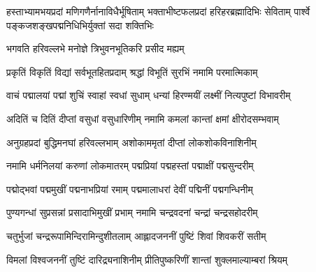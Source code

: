 
%
%
%
%

{हस्ताभ्यामभयप्रदां मणिगणैर्नानाविधैर्भूषिताम्}
{भक्ताभीष्टफलप्रदां हरिहरब्रह्मादिभिः सेविताम्}
{पार्श्वे पङ्कजशङ्खपद्मनिधिभिर्युक्तां सदा शक्तिभिः}

{भगवति हरिवल्लभे मनोज्ञे त्रिभुवनभूतिकरि प्रसीद मह्यम्}

\resetShloka
\twolineshloka
{प्रकृतिं विकृतिं विद्यां सर्वभूतहितप्रदाम्}
{श्रद्धां विभूतिं सुरभिं नमामि परमात्मिकाम्}

\twolineshloka
{वाचं पद्मालयां पद्मां शुचिं स्वाहां स्वधां सुधाम्}
{धन्यां हिरण्मयीं लक्ष्मीं नित्यपुष्टां विभावरीम्}

\twolineshloka
{अदितिं च दितिं दीप्तां वसुधां वसुधारिणीम्}
{नमामि कमलां कान्तां क्षमां क्षीरोदसम्भवाम्}

\twolineshloka
{अनुग्रहप्रदां बुद्धिमनघां हरिवल्लभाम्}
{अशोकाममृतां दीप्तां लोकशोकविनाशिनीम्}

\twolineshloka
{नमामि धर्मनिलयां करुणां लोकमातरम्}
{पद्मप्रियां पद्महस्तां पद्माक्षीं पद्मसुन्दरीम्}

\twolineshloka
{पद्मोद्भवां पद्ममुखीं पद्मनाभप्रियां रमाम्}
{पद्ममालाधरां देवीं पद्मिनीं पद्मगन्धिनीम्}

\twolineshloka
{पुण्यगन्धां सुप्रसन्नां प्रसादाभिमुखीं प्रभाम्}
{नमामि चन्द्रवदनां चन्द्रां चन्द्रसहोदरीम्}

\twolineshloka
{चतुर्भुजां चन्द्ररूपामिन्दिरामिन्दुशीतलाम्}
{आह्लादजननीं पुष्टिं शिवां शिवकरीं सतीम्}

\twolineshloka
{विमलां विश्वजननीं तुष्टिं दारिद्र्यनाशिनीम्}
{प्रीतिपुष्करिणीं शान्तां शुक्लमाल्याम्बरां श्रियम्}

